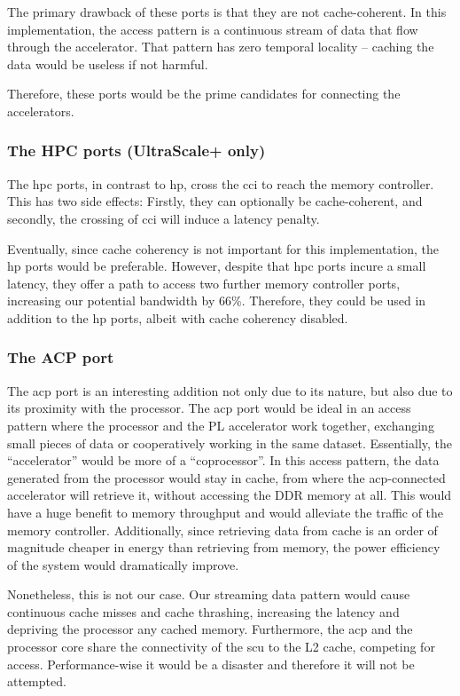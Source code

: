 The primary drawback of these ports is that they are not cache-coherent.
In this implementation, the access pattern is a continuous stream of data
that flow through the accelerator. That pattern has zero temporal locality --
caching the data would be useless if not harmful.

Therefore, these ports would be the prime candidates for connecting 
the accelerators.

\subsubsection{The HPC ports (UltraScale+ only)}

The \gls{hpc} ports, in contrast to \gls{hp}, cross the \gls{cci} to reach
the memory controller. This has two side effects: Firstly, they can 
optionally be cache-coherent, and secondly, the crossing of \gls{cci}
will induce a latency penalty.

Eventually, since cache coherency is not important for this implementation,
the \gls{hp} ports would be preferable. However, despite that \gls{hpc} ports
incure a small latency, they offer a path to access two further memory controller
ports, increasing our potential bandwidth by 66\%. 
Therefore, they could be used in addition to the \gls{hp} ports, albeit with
cache coherency disabled.

\subsubsection{The ACP port}

The \gls{acp} port is an interesting addition not only due to its 
nature, but also due to its proximity with the processor. 
The \gls{acp} port would be ideal in an access pattern where the processor and the PL accelerator
work together, exchanging small pieces of data or cooperatively working in the same dataset.
Essentially, the ``accelerator'' would be more of a ``coprocessor''.
In this access pattern, the data generated from the processor would stay in cache, from where
the \gls{acp}-connected accelerator will retrieve it, without accessing the DDR memory at all.
This would have a huge benefit to memory throughput and
would alleviate the traffic of the memory controller. Additionally, since retrieving data
from cache is an order of magnitude cheaper in energy than retrieving from memory,
the power efficiency of the system would dramatically improve.

Nonetheless, this is not our case. Our streaming data pattern would 
cause continuous cache misses and cache thrashing,
increasing the latency and depriving the processor any cached memory.
Furthermore, the \gls{acp} and the processor core share the connectivity
of the \gls{scu} to the L2 cache, competing for access.
Performance-wise it would be a disaster and therefore it will not be attempted.

